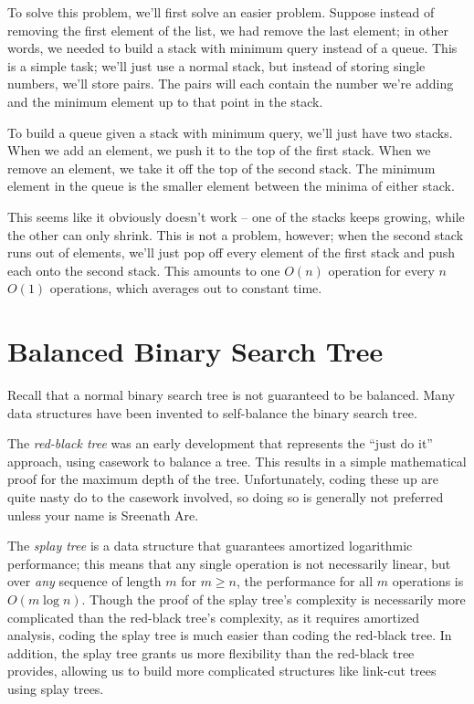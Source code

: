 \documentclass[11pt]{book}
\begin{document}
To solve this problem, we'll first solve an easier problem. Suppose instead of removing the first element of the list, we had remove the last element; in other words, we needed to build a stack with minimum query instead of a queue. This is a simple task; we'll just use a normal stack, but instead of storing single numbers, we'll store pairs. The pairs will each contain the number we're adding and the minimum element up to that point in the stack.

To build a queue given a stack with minimum query, we'll just have two stacks. When we add an element, we push it to the top of the first stack. When we remove an element, we take it off the top of the second stack. The minimum element in the queue is the smaller element between the minima of either stack.

This seems like it obviously doesn't work -- one of the stacks keeps growing, while the other can only shrink. This is not a problem, however; when the second stack runs out of elements, we'll just pop off every element of the first stack and push each onto the second stack. This amounts to one $O(n)$ operation for every $n$ $O(1)$ operations, which averages out to constant time.

\section{Balanced Binary Search Tree}

Recall that a normal binary search tree is not guaranteed to be balanced. Many data structures have been invented to self-balance the binary search tree.

The \textit{red-black tree} was an early development that represents the ``just do it'' approach, using casework to balance a tree. This results in a simple mathematical proof for the maximum depth of the tree. Unfortunately, coding these up are quite nasty do to the casework involved, so doing so is generally not preferred unless your name is Sreenath Are.

The \textit{splay tree} is a data structure that guarantees amortized logarithmic performance; this means that any single operation is not necessarily linear, but over \textit{any} sequence of length $m$ for $m \ge n$, the performance for all $m$ operations is $O(m \log{n})$. Though the proof of the splay tree's complexity is necessarily more complicated than the red-black tree's complexity, as it requires amortized analysis, coding the splay tree is much easier than coding the red-black tree. In addition, the splay tree grants us more flexibility than the red-black tree provides, allowing us to build more complicated structures like link-cut trees using splay trees.
\end{document}
